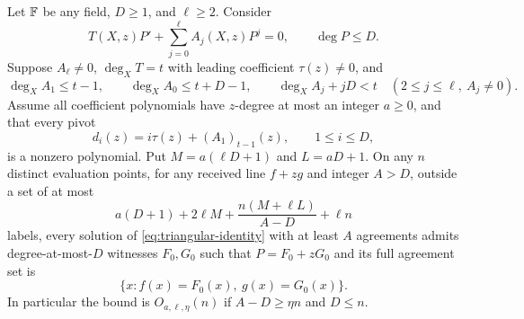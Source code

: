\begin{theorem}\label{thm:triangular-newton}
Let $\mathbb F$ be any field, $D\ge1$, and $\ell\ge2$. Consider
\begin{equation}\label{eq:triangular-identity}
 T(X,z)P'+\sum_{j=0}^{\ell}A_j(X,z)P^j=0,
 \qquad \deg P\le D.
\end{equation}
Suppose $A_\ell\ne0$, $\deg_X T=t$ with leading coefficient
$\tau(z)\ne0$, and
\begin{equation}\label{eq:triangular-degree-separation}
 \deg_X A_1\le t-1,\qquad \deg_X A_0\le t+D-1,\qquad
 \deg_X A_j+jD<t\quad(2\le j\le\ell,\ A_j\ne0).
\end{equation}
Assume all coefficient polynomials have $z$-degree at most an integer $a\ge0$, and
that every pivot
\[
 d_i(z)=i\tau(z)+(A_1)_{t-1}(z),\qquad 1\le i\le D,
\]
is a nonzero polynomial. Put $M=a(\ell D+1)$ and $L=aD+1$.
On any $n$ distinct evaluation points, for any received line $f+zg$ and
integer $A>D$, outside a set of at most
\begin{equation}\label{eq:triangular-exception-bound}
 a(D+1)+2\ell M+\frac{n(M+\ell L)}{A-D}+\ell n
\end{equation}
labels, every solution of \eqref{eq:triangular-identity} with at least $A$
agreements admits degree-at-most-$D$ witnesses $F_0,G_0$ such that
$P=F_0+zG_0$ and its full agreement set is
\[
 \{x:f(x)=F_0(x),\ g(x)=G_0(x)\}.
\]
In particular the bound is $O_{a,\ell,\eta}(n)$ if
$A-D\ge\eta n$ and $D\le n$.
\end{theorem}
